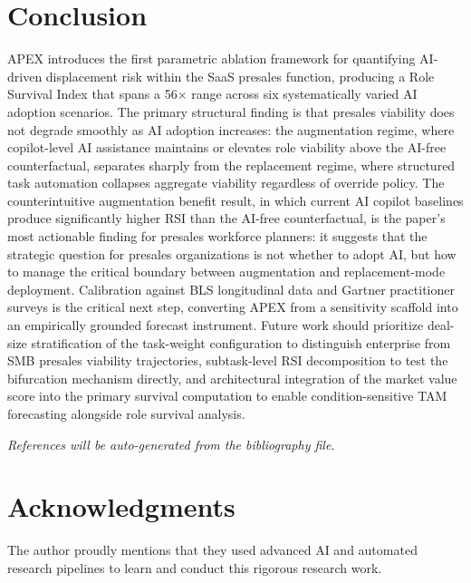 \documentclass[10pt, conference]{IEEEtran}
\begin{document}
\section{Conclusion}

\label{sec:conclusion}

APEX introduces the first parametric ablation framework for quantifying AI-driven displacement risk within the SaaS presales function, producing a Role Survival Index that spans a 56$\times$ range across six systematically varied AI adoption scenarios. The primary structural finding is that presales viability does not degrade smoothly as AI adoption increases: the augmentation regime, where copilot-level AI assistance maintains or elevates role viability above the AI-free counterfactual, separates sharply from the replacement regime, where structured task automation collapses aggregate viability regardless of override policy. The counterintuitive augmentation benefit result, in which current AI copilot baselines produce significantly higher RSI than the AI-free counterfactual, is the paper's most actionable finding for presales workforce planners: it suggests that the strategic question for presales organizations is not whether to adopt AI, but how to manage the critical boundary between augmentation and replacement-mode deployment. Calibration against BLS longitudinal data and Gartner practitioner surveys is the critical next step, converting APEX from a sensitivity scaffold into an empirically grounded forecast instrument. Future work should prioritize deal-size stratification of the task-weight configuration to distinguish enterprise from SMB presales viability trajectories, subtask-level RSI decomposition to test the bifurcation mechanism directly, and architectural integration of the market value score into the primary survival computation to enable condition-sensitive TAM forecasting alongside role survival analysis.

\textit{References will be auto-generated from the bibliography file.}

\section{Acknowledgments}

\label{sec:acknowledgments}

The author proudly mentions that they used advanced AI and automated research pipelines to learn and conduct this rigorous research work.



\end{document}
